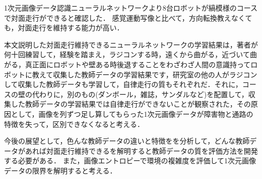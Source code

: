 1次元画像データ認識ニューラルネットワークより8台ロボットが縞模様のコースで対面走行ができると確認した．
感覚運動写像と比べて，方向転換教えなくても，対面走行を維持する能力が高い．

本文説明した対面走行維持できるニューラルネットワークの学習結果は，著者が何十回練習して，経験を踏まえ，ラジコンする時，遠くから曲がる，近づいて曲がる，真正面にロボットや壁ある時後退することをわざわざ人間の意識持ってロボットに教えて収集した教師データの学習結果です，研究室の他の人がラジコンして収集した教師データも学習して，自律走行の質もそれぞれだ．それに，コースの壁の代わりに，別のもの(ダンボール，雑誌，サンダルなど)を配置して，収集した教師データの学習結果では自律走行ができないことが観察された，その原因として，画像を列ずつ足し算してもらった1次元画像データが障害物と通路の特徴を失って，区別できなくなると考える．

今後の展望として，色んな教師データの違いと特徴をを分析して，どんな教師データがあれば対面走行維持できるを解明すると教師データの質を評価方法を開発する必要がある．
また，画像エントロピーで環境の複雑度を評価して1次元画像データの限界を解明すると考える．

